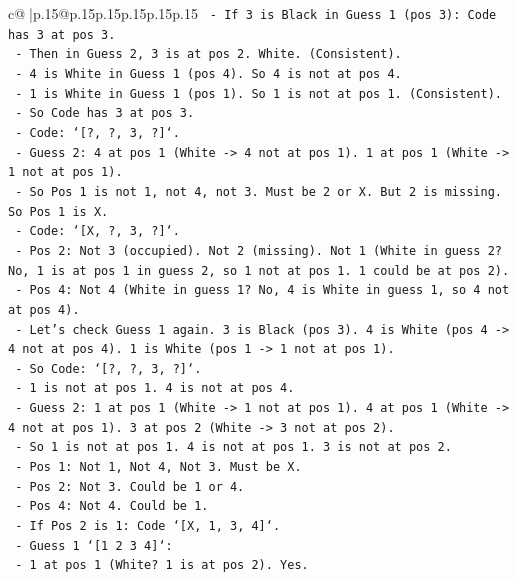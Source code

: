 \documentclass{article}
\begin{document}
{\begin{supertabular}{c@{$\;$}|p{.15\linewidth}@{}p{.15\linewidth}p{.15\linewidth}p{.15\linewidth}p{.15\linewidth}p{.15\linewidth}}
{{{\texttt{      {-} If 3 is Black in Guess 1 (pos 3): Code has 3 at pos 3.} \\
\texttt{        {-} Then in Guess 2, 3 is at pos 2. White. (Consistent).} \\
\texttt{        {-} 4 is White in Guess 1 (pos 4). So 4 is not at pos 4.} \\
\texttt{        {-} 1 is White in Guess 1 (pos 1). So 1 is not at pos 1. (Consistent).} \\
\texttt{      {-} So Code has 3 at pos 3.} \\
\texttt{      {-} Code: `{[}?, ?, 3, ?{]}`.} \\
\texttt{      {-} Guess 2: 4 at pos 1 (White {-}> 4 not at pos 1). 1 at pos 1 (White {-}> 1 not at pos 1).} \\
\texttt{      {-} So Pos 1 is not 1, not 4, not 3. Must be 2 or X. But 2 is missing. So Pos 1 is X.} \\
\texttt{      {-} Code: `{[}X, ?, 3, ?{]}`.} \\
\texttt{      {-} Pos 2: Not 3 (occupied). Not 2 (missing). Not 1 (White in guess 2? No, 1 is at pos 1 in guess 2, so 1 not at pos 1. 1 could be at pos 2).} \\
\texttt{      {-} Pos 4: Not 4 (White in guess 1? No, 4 is White in guess 1, so 4 not at pos 4).} \\
\texttt{      {-} Let's check Guess 1 again. 3 is Black (pos 3). 4 is White (pos 4 {-}> 4 not at pos 4). 1 is White (pos 1 {-}> 1 not at pos 1).} \\
\texttt{      {-} So Code: `{[}?, ?, 3, ?{]}`.} \\
\texttt{      {-} 1 is not at pos 1. 4 is not at pos 4.} \\
\texttt{      {-} Guess 2: 1 at pos 1 (White {-}> 1 not at pos 1). 4 at pos 1 (White {-}> 4 not at pos 1). 3 at pos 2 (White {-}> 3 not at pos 2).} \\
\texttt{      {-} So 1 is not at pos 1. 4 is not at pos 1. 3 is not at pos 2.} \\
\texttt{      {-} Pos 1: Not 1, Not 4, Not 3. Must be X.} \\
\texttt{      {-} Pos 2: Not 3. Could be 1 or 4.} \\
\texttt{      {-} Pos 4: Not 4. Could be 1.} \\
\texttt{      {-} If Pos 2 is 1: Code `{[}X, 1, 3, 4{]}`.} \\
\texttt{        {-} Guess 1 `{[}1 2 3 4{]}`:} \\
\texttt{          {-} 1 at pos 1 (White? 1 is at pos 2). Yes.} \\
}}}
\end{supertabular}}
\end{document}
